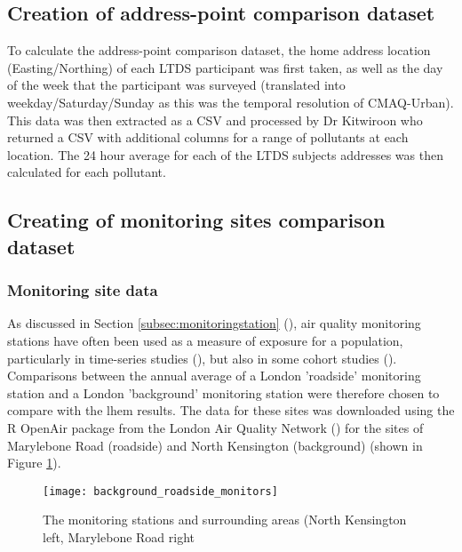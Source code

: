     \subsection{Creation of address-point comparison dataset}
    \label{sec:creating_address_point_dataset}

To calculate the address-point comparison dataset, the home address location (Easting/Northing) of each LTDS participant was first taken, as well as the day of the week that the participant was surveyed (translated into weekday/Saturday/Sunday as this was the temporal resolution of CMAQ-Urban). This data was then extracted as a CSV and processed by Dr Kitwiroon who returned a CSV with additional columns for a range of pollutants at each location. The 24 hour average for each of the LTDS subjects addresses was then calculated for each pollutant.

    \subsection{Creating of monitoring sites comparison dataset}
    \label{sec:creating_monitoring_site_dataset}

        \subsubsection{Monitoring site data}
        \label{sec:monitoring_site_data}

As discussed in Section \ref{subsec:monitoringstation} (), air quality monitoring stations have often been used as a measure of exposure for a population, particularly in time-series studies (\cite{Atkinson2010}), but also in some cohort studies (\cite{Dockery1993}). Comparisons between the annual average of a London 'roadside' monitoring station and a London 'background' monitoring station were therefore chosen to compare with the \gls{lhem} results. The data for these sites was downloaded using the R OpenAir package from the London Air Quality Network (\cite{LondonAir}) for the sites of Marylebone Road (roadside) and North Kensington (background) (shown in Figure \ref{fig:background_roadside_monitors}).

\begin{figure}[H]
\centering
\texttt{[image: background\_roadside\_monitors]}
\caption{The monitoring stations and surrounding areas (North Kensington left, Marylebone Road right}
\label{fig:background_roadside_monitors}
\end{figure}

